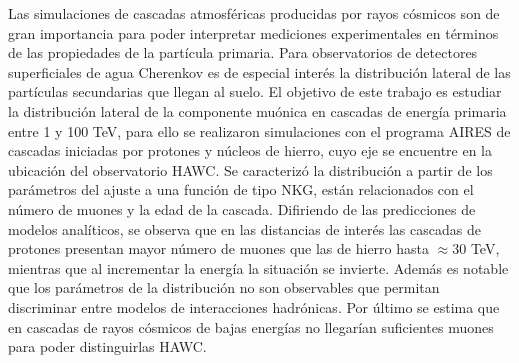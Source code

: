 
Las simulaciones de cascadas atmosf\'ericas producidas por rayos c\'osmicos son de gran importancia para poder interpretar mediciones experimentales en t\'erminos de las propiedades de la part\'icula primaria. Para observatorios de detectores superficiales de agua Cherenkov es de especial inter\'es la distribuci\'on lateral de las part\'iculas secundarias que llegan al suelo. El objetivo de este trabajo es estudiar la distribuci\'on lateral de la componente mu\'onica en cascadas de energ\'ia primaria entre 1 y 100 TeV, para ello se realizaron simulaciones con el programa AIRES de cascadas iniciadas por protones y n\'ucleos de hierro, cuyo eje se encuentre en la ubicaci\'on del observatorio HAWC. Se caracteriz\'o la distribuci\'on a partir de los par\'ametros del ajuste a una funci\'on de tipo NKG, \DIFdelbegin {}\DIFdelend \DIFaddbegin {}\DIFaddend est\'an relacionados con el n\'umero de muones y la edad de la cascada. Difiriendo de las predicciones de modelos anal\'iticos, se observa que en las distancias de inter\'es las cascadas de protones presentan mayor n\'umero de muones que las de hierro hasta $\approx 30$ TeV, mientras que al incrementar la energ\'ia la situaci\'on se invierte. Adem\'as es notable que los par\'ametros de la distribuci\'on no son observables que permitan discriminar entre modelos de interacciones hadr\'onicas. Por \'ultimo se estima que en cascadas de rayos c\'osmicos de bajas energ\'ias no llegar\'ian suficientes muones para poder distinguirlas \DIFdelbegin {}\DIFdelend \DIFaddbegin {}\DIFaddend HAWC.


 
\singlespacing